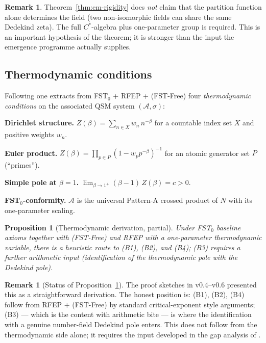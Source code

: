 \documentclass[11pt,a4paper]{article}
\theoremstyle{plain}
\newtheorem{proposition}[theorem]{Proposition}
\theoremstyle{definition}
\newtheorem{remark}[theorem]{Remark}
\begin{document}
\begin{remark}
Theorem~\ref{thm:cm-rigidity} does \emph{not} claim that the
partition function alone determines the field (two non-isomorphic
fields can share the same Dedekind zeta).  The full $C^\ast$-algebra
plus one-parameter group is required.  This is an important
hypothesis of the theorem; it is stronger than the input the
emergence programme actually supplies.
\end{remark}

\subsection{Thermodynamic conditions}
\label{sec:thermo-B}

Following \cite{LemmaThreeTwo,ThermoDerivation} one extracts from
FST$_0$ + RFEP + (FST-Free) four \emph{thermodynamic conditions} on
the associated QSM system $(\mathcal A, \sigma)$:

\begin{description}[leftmargin=*,style=nextline]
\item[(B1)] \textbf{Dirichlet structure.} $Z(\beta) = \sum_{n \in X}
  w_n\, n^{-\beta}$ for a countable index set $X$ and positive
  weights $w_n$.
\item[(B2)] \textbf{Euler product.} $Z(\beta) = \prod_{p \in P}
  (1-w_p p^{-\beta})^{-1}$ for an atomic generator set $P$
  (``primes'').
\item[(B3)] \textbf{Simple pole at $\beta=1$.} $\lim_{\beta \to 1^+}
  (\beta-1)\, Z(\beta) = c > 0$.
\item[(B4)] \textbf{FST$_0$-conformity.} $\mathcal A$ is the
  universal Pattern-A crossed product of $N$ with its one-parameter
  scaling.
\end{description}

\begin{proposition}[Thermodynamic
derivation, partial]\label{prop:thermo-derivation}
Under FST$_0$ baseline axioms together with (FST-Free) and RFEP with
a one-parameter thermodynamic variable, there is a heuristic route
to (B1), (B2), and (B4); (B3) requires a further arithmetic input
(identification of the thermodynamic pole with the Dedekind pole).
\end{proposition}

\begin{remark}[Status of Proposition~\ref{prop:thermo-derivation}]
\label{rem:thermo-status}
The proof sketches in v0.4--v0.6 presented this as a straightforward
derivation.  The honest position is: (B1), (B2), (B4) follow from
RFEP + (FST-Free) by standard critical-exponent style arguments;
(B3) --- which is the content with arithmetic bite --- is where the
identification with a genuine number-field Dedekind pole enters.
This does not follow from the thermodynamic side alone; it requires
the input developed in the gap analysis of \cite{L1KAttack}.
\end{remark}
\end{document}
